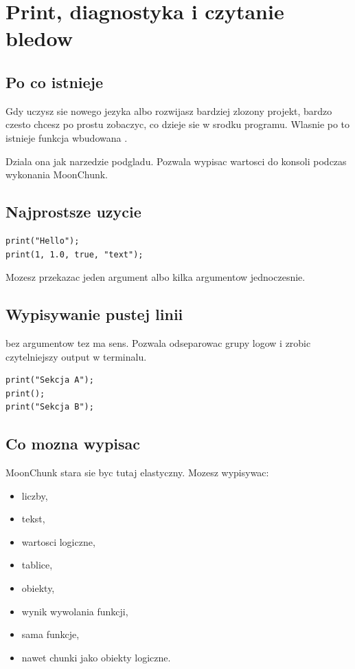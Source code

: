 \chapter{Print, diagnostyka i czytanie bledow}

\section{Po co istnieje }
Gdy uczysz sie nowego jezyka albo rozwijasz bardziej zlozony projekt, bardzo czesto
chcesz po prostu zobaczyc, co dzieje sie w srodku programu. Wlasnie po to istnieje
funkcja wbudowana .

Dziala ona jak narzedzie podgladu. Pozwala wypisac wartosci do konsoli podczas wykonania
MoonChunk.

\section{Najprostsze uzycie}
\begin{lstlisting}[style=moonchunk,caption={Podstawowe wypisywanie wartosci}]
print("Hello");
print(1, 1.0, true, "text");
\end{lstlisting}

Mozesz przekazac jeden argument albo kilka argumentow jednoczesnie.

\section{Wypisywanie pustej linii}
 bez argumentow tez ma sens. Pozwala odseparowac grupy logow i zrobic
czytelniejszy output w terminalu.

\begin{lstlisting}[style=moonchunk,caption={Pusta linia przez print()}]
print("Sekcja A");
print();
print("Sekcja B");
\end{lstlisting}

\section{Co mozna wypisac}
MoonChunk stara sie byc tutaj elastyczny. Mozesz wypisywac:

\begin{itemize}
  \item liczby,
  \item tekst,
  \item wartosci logiczne,
  \item tablice,
  \item obiekty,
  \item wynik wywolania funkcji,
  \item sama funkcje,
  \item nawet chunki jako obiekty logiczne.
\end{itemize}

